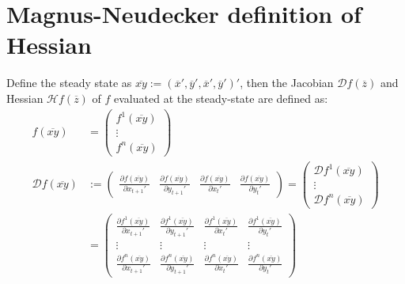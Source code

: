 \documentclass{article}
\begin{document}
\section{Magnus-Neudecker definition of Hessian}\label{App:MagnNeu}
Define the steady state as $\overline{xy} := (\overline{x}',\overline{y}',\overline{x}',\overline{y}')'$, then the Jacobian $\mathcal{D}f(\overline{z})$ and Hessian $\mathcal{H}f(\overline{z})$ of $f$ evaluated at the steady-state are defined as:
\begin{align*}
  f(\overline{xy})&=\begin{pmatrix} f^1(\overline{xy})\\\vdots\\ f^n(\overline{xy}) \end{pmatrix}\\
  \mathcal{D} f(\overline{xy}) &:= \begin{pmatrix} \frac{\partial f(\overline{xy})}{\partial x_{t+1}'} & \frac{\partial f(\overline{xy})}{\partial y_{t+1}'} & \frac{\partial f(\overline{xy})}{\partial x_{t}'} & \frac{\partial f(\overline{xy})}{\partial y_{t}'}\end{pmatrix}
  = \begin{pmatrix}
    \mathcal{D}f^1(\overline{xy})\\\vdots\\    \mathcal{D}f^n(\overline{xy})
  \end{pmatrix}\\
  &=\begin{pmatrix}
    \frac{\partial f^1(\overline{xy})}{\partial x_{t+1}'} & \frac{\partial f^1(\overline{xy})}{\partial y_{t+1}'} & \frac{\partial f^1(\overline{xy})}{\partial x_{t}'} & \frac{\partial f^1(\overline{xy})}{\partial y_{t}'}\\
    \vdots & \vdots & \vdots & \vdots\\
    \frac{\partial f^n(\overline{xy})}{\partial x_{t+1}'} & \frac{\partial f^n(\overline{xy})}{\partial y_{t+1}'} & \frac{\partial f^n(\overline{xy})}{\partial x_{t}'} & \frac{\partial f^n(\overline{xy})}{\partial y_{t}'}
  \end{pmatrix}
\end{align*}
\end{document}
